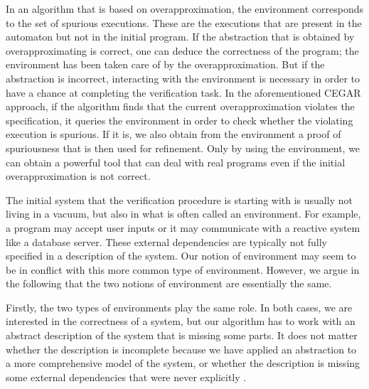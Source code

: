 \documentclass[../../diss.tex]{subfiles}
\begin{document}
In an algorithm that is based on overapproximation, the environment corresponds to the set of spurious executions.
These are the executions that are present in the automaton but not in the initial program.
If the abstraction that is obtained by overapproximating is correct, one can deduce the correctness of the program; the environment has been taken care of by the overapproximation.
But if the abstraction is incorrect, interacting with the environment is necessary in order to have a chance at completing the verification task.
In the aforementioned CEGAR approach, if the algorithm finds that the current overapproximation violates the specification, it queries the environment in order to check whether the violating execution is spurious.
If it is, we also obtain from the environment a proof of spuriousness that is then used for refinement.
Only by using the environment, we can obtain a powerful tool that can deal with real programs even if the initial overapproximation is not correct.

The initial system that the verification procedure is starting with is usually not living in a vacuum, but also in what is often called an environment.
For example, a program may accept user inputs or it may communicate with a reactive system like a database server.
These external dependencies are typically not fully specified in a description of the system.
Our notion of environment may seem to be in conflict with this more common type of environment.
However, we argue in the following that the two notions of environment are essentially the same.

Firstly, the two types of environments play the same role.
In both cases, we are interested in the correctness of a system, but our algorithm has to work with an abstract description of the system that is missing some parts.
It does not matter whether the description is incomplete because we have applied an abstraction to a more comprehensive model of the system, or whether the description is missing some external dependencies that were never explicitly .
\end{document}
